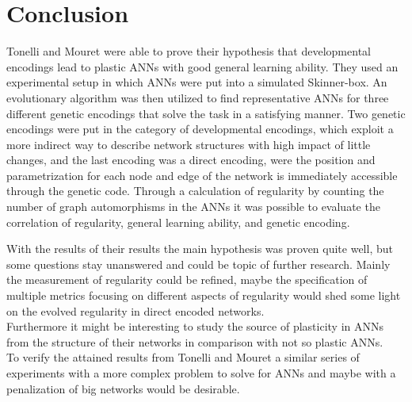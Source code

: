 \documentclass[12pt,twoside]{article}
\theoremstyle{plain}
\theoremstyle{definition}
\theoremstyle{remark}
\begin{document}


\section{Conclusion}
\label{sec:concl}
Tonelli and Mouret were able to prove their hypothesis that developmental encodings lead to plastic ANNs with good general learning ability.
They used an experimental setup in which ANNs were put into a simulated Skinner-box. An evolutionary algorithm was then utilized to find representative ANNs for three different genetic encodings that solve the task in a satisfying manner.
Two genetic encodings were put in the category of developmental encodings, which exploit a more indirect way to describe network structures with high impact of little changes, and the last encoding was a direct encoding, were the position and parametrization for each node and edge of the network is immediately accessible through the genetic code.
Through a calculation of regularity by counting the number of graph automorphisms in the ANNs it was possible to evaluate the correlation of regularity, general learning ability, and genetic encoding.\medskip

With the results of their results the main hypothesis was proven quite well, but some questions stay unanswered and could be topic of further research.
Mainly the measurement of regularity could be refined, maybe the specification of multiple metrics focusing on different aspects of regularity would shed some light on the evolved regularity in direct encoded networks.\\
Furthermore it might be interesting to study the source of plasticity in ANNs from the structure of their networks in comparison with not so plastic ANNs.\\
To verify the attained results from Tonelli and Mouret a similar series of experiments with a more complex problem to solve for ANNs and maybe with a penalization of big networks would be desirable.

%
%
\newpage


\end{document}
